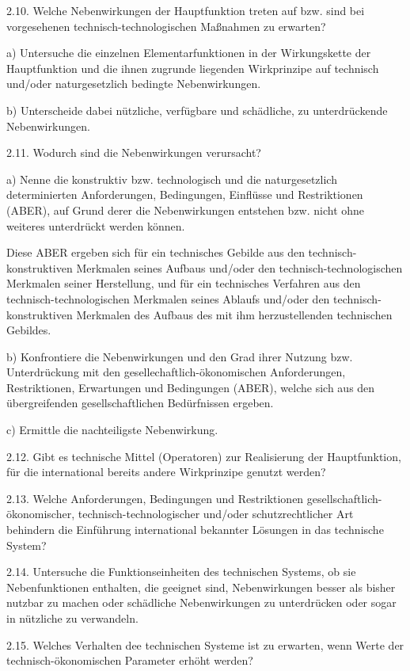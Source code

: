 \documentclass[11pt,a4paper]{article}
\begin{document}
2.10. Welche Nebenwirkungen der Hauptfunktion treten auf bzw. sind bei
vorgesehenen technisch-technologischen Maßnahmen zu erwarten?

a) Untersuche die einzelnen Elementarfunktionen in der Wirkungskette der
Hauptfunktion und die ihnen zugrunde liegenden Wirkprinzipe auf technisch
und/oder naturgesetzlich bedingte Nebenwirkungen.

b) Unterscheide dabei nützliche, verfügbare und schädliche, zu unterdrückende
Nebenwirkungen.

2.11. Wodurch sind die Nebenwirkungen verursacht?

a) Nenne die konstruktiv bzw. technologisch und die naturgesetzlich
determinierten Anforderungen, Bedingungen, Einflüsse und Restriktionen (ABER),
auf Grund derer die Nebenwirkungen entstehen bzw. nicht ohne weiteres
unterdrückt werden können.

Diese ABER ergeben sich für ein technisches Gebilde aus den
technisch-konstruktiven Merkmalen seines Aufbaus und/oder den
technisch-technologischen Merkmalen seiner Herstellung, und für ein
technisches Verfahren aus den technisch-technologischen Merkmalen seines
Ablaufs und/oder den technisch-konstruktiven Merkmalen des Aufbaus des mit ihm
herzustellenden technischen Gebildes.

b) Konfrontiere die Nebenwirkungen und den Grad ihrer Nutzung bzw.
Unterdrückung mit den gesellechaftlich-ökonomischen Anforderungen,
Restriktionen, Erwartungen und Bedingungen (ABER), welche sich aus den
übergreifenden gesellschaftlichen Bedürfnissen ergeben.

c) Ermittle die nachteiligste Nebenwirkung.

2.12. Gibt es technische Mittel (Operatoren) zur Realisierung der
Hauptfunktion, für die international bereits andere Wirkprinzipe genutzt
werden?

2.13. Welche Anforderungen, Bedingungen und Restriktionen
gesellschaftlich-ökonomischer, technisch-technologischer und/oder
schutzrechtlicher Art behindern die Einführung international bekannter
Lösungen in das technische System?  

2.14. Untersuche die Funktionseinheiten des technischen Systems, ob sie
Nebenfunktionen enthalten, die geeignet sind, Nebenwirkungen besser als bisher
nutzbar zu machen oder schädliche Nebenwirkungen zu unterdrücken oder sogar in
nützliche zu verwandeln.

2.15. Welches Verhalten dee technischen Systeme ist zu erwarten, wenn Werte
der technisch-ökonomischen Parameter erhöht werden?
\end{document}
